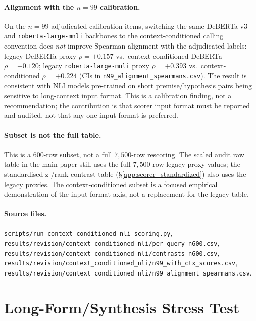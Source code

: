 \paragraph{Alignment with the $n=99$ calibration.} On the
$n=99$ adjudicated calibration items, switching the same DeBERTa-v$3$
and \texttt{roberta-large-mnli} backbones to the context-conditioned
calling convention does \emph{not} improve Spearman alignment with the
adjudicated labels: legacy DeBERTa proxy $\rho=+0.157$ vs.\
context-conditioned DeBERTa $\rho=+0.120$; legacy
\texttt{roberta-large-mnli} proxy $\rho=+0.393$ vs.\
context-conditioned $\rho=+0.224$ (CIs in
\texttt{n99\_alignment\_spearmans.csv}). The result is consistent with
NLI models pre-trained on short premise/hypothesis pairs being
sensitive to long-context input format. This is a calibration finding,
not a recommendation; the contribution is that scorer input format
must be reported and audited, not that any one input format is
preferred.

\paragraph{Subset is not the full table.} This is a $600$-row
subset, not a full $7{,}500$-row rescoring. The scaled audit raw
table in the main paper still uses the full $7{,}500$-row legacy
proxy values; the standardised z-/rank-contrast table
(\S\ref{app:scorer_standardized}) also uses the legacy proxies. The
context-conditioned subset is a focused empirical demonstration of
the input-format axis, not a replacement for the legacy table.

\paragraph{Source files.}
\begin{sloppypar}
\texttt{scripts/run\_context\_conditioned\_nli\_scoring.py},
\texttt{results/revision/context\_conditioned\_nli/per\_query\_n600.csv},
\texttt{results/revision/context\_conditioned\_nli/contrasts\_n600.csv},
\texttt{results/revision/context\_conditioned\_nli/n99\_with\_ctx\_scores.csv},
\texttt{results/revision/context\_conditioned\_nli/n99\_alignment\_spearmans.csv}.
\end{sloppypar}

\section{Long-Form/Synthesis Stress Test}
\label{app:long_form}

